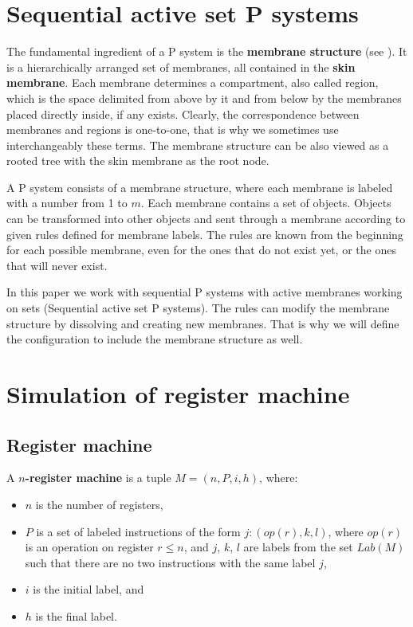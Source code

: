 \documentclass[llncs,submission,copyright,creativecommons]{../lib/lncs/llncs}
\begin{document}
  
\section{Sequential active set P systems}
\label{sec:p systems}


The fundamental ingredient of a P system is the {\bf membrane structure} (see \cite{Paun2006Introduction}). It is a hierarchically arranged set of membranes, all contained in the {\bf skin membrane}. Each membrane determines a compartment, also called region, which is the space delimited from above by it and from below by the membranes placed directly inside, if any exists. Clearly, the correspondence between membranes and regions is one-to-one, that is why we sometimes use interchangeably these terms.
The membrane structure can be also viewed as a rooted tree with the skin membrane as the root node.

A P system consists of a membrane structure, where each membrane is labeled with a number from 1 to $m$. Each membrane contains a set of objects. Objects can be transformed into other objects and sent through a membrane according to given rules defined for membrane labels. The rules are known from the beginning for each possible membrane, even for the ones that do not exist yet, or the ones that will never exist.

In this paper we work with sequential P systems with active membranes working on sets (Sequential active set P systems). The rules can modify the membrane structure by dissolving and creating new membranes. That is why we will define the configuration to include the membrane structure as well.




\section{Simulation of register machine} %
\label{sec:simulation_of_register_machine}

\subsection{Register machine} %
\label{sub:register_machine}

\begin{definition}
  A {\bf $n$-register machine} is a tuple $M = (n,P,i,h)$, where:
  \begin{itemize}
    \item $n$ is the number of registers,
    \item $P$ is a set of labeled instructions of the form $j : (op(r),k,l)$, where $op(r)$ is an operation on register $r\leq n$, and $j$, $k$, $l$ are labels from the set $Lab(M)$ such that there are no two instructions with the same label $j$,
    \item $i$ is the initial label, and
    \item $h$ is the final label.
  \end{itemize}
\end{definition}
\end{document}
